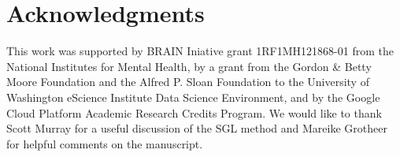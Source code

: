 \documentclass[10pt,letterpaper]{article}
\begin{document}
\section*{Acknowledgments}

This work was supported by BRAIN Iniative grant 1RF1MH121868-01 from the
National Institutes for Mental Health, by a grant from the Gordon \& Betty
Moore Foundation and the Alfred P. Sloan Foundation to the University of
Washington eScience Institute Data Science Environment, and by the Google
Cloud Platform Academic Research Credits Program. We would like to thank
Scott Murray for a useful discussion of the SGL method and Mareike Grotheer
for helpful comments on the manuscript.

\nolinenumbers


\end{document}
